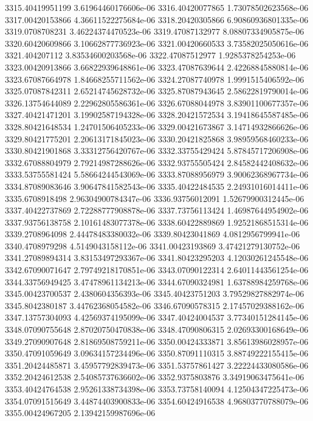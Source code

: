 {3315.40419951199 3.61964460176606e-06
3316.40420077865 1.73078502623568e-06
3317.00420153866 4.36611522275684e-06
3318.20420305866 6.90860936801335e-06
3319.0708708231 3.46224374470523e-06
3319.47087132977 8.08807334905875e-06
3320.60420609866 3.10662877736923e-06
3321.00420660533 3.73582025050616e-06
3321.404207112 3.83534600203568e-06
3322.47087512977 1.9285378254253e-06
3323.00420913866 3.66822939648861e-06
3323.47087639644 2.42268845880814e-06
3323.67087664978 1.84668255711562e-06
3324.27087740978 1.9991515406592e-06
3325.07087842311 2.65214745628732e-06
3325.87087943645 2.58622819790014e-06
3326.13754644089 2.22962805586361e-06
3326.67088044978 3.83901100677357e-06
3327.40421471201 3.19902587194328e-06
3328.20421572534 3.19418645587485e-06
3328.80421648534 1.24701506405233e-06
3329.00421673867 3.14714932866626e-06
3329.80421775201 2.20613171845023e-06
3330.20421825868 3.98959568460233e-06
3330.80421901868 3.33312756420767e-06
3332.33755429424 5.87845717206908e-06
3332.67088804979 2.79214987288626e-06
3332.93755505424 2.84582442408632e-06
3333.53755581424 5.58664244543069e-06
3333.87088956979 3.90062368967734e-06
3334.87089083646 3.90647841582543e-06
3335.40422484535 2.24931016014411e-06
3335.6708918498 2.96304900784347e-06
3336.93756012091 1.52679900312445e-06
3337.40422737869 2.72288777908878e-06
3337.73756113424 1.46987644954902e-06
3337.93756138758 2.10161483077378e-06
3338.60422889869 1.92521868515314e-06
3339.2708964098 2.44478483380032e-06
3339.80423041869 4.0812956799941e-06
3340.4708979298 4.5149043158112e-06
3341.00423193869 3.47421279130752e-06
3341.27089894314 3.83153497293367e-06
3341.80423295203 4.12030261245548e-06
3342.67090071647 2.79749218170851e-06
3343.07090122314 2.64011443561254e-06
3344.33756949425 3.47478961134213e-06
3344.67090324981 1.63788984259768e-06
3345.00423700537 2.4380604356393e-06
3345.40423751203 3.79529827882974e-06
3345.8042380187 3.44762368054582e-06
3346.67090578315 2.17457029388162e-06
3347.13757304093 4.42569374195099e-06
3347.40424004537 3.77340151284145e-06
3348.07090755648 2.87020750470838e-06
3348.47090806315 2.02693300168649e-06
3349.27090907648 2.81869508759211e-06
3350.00424333871 3.85613986028957e-06
3350.47091059649 3.09634157234496e-06
3350.87091110315 3.88749222155415e-06
3351.20424485871 3.45957792839473e-06
3351.53757861427 3.22224433080586e-06
3352.20424612538 2.54085737636602e-06
3352.9375803876 3.34919063475641e-06
3353.40424764538 2.95261338734398e-06
3353.73758140094 4.12504347225473e-06
3354.07091515649 3.44874403900833e-06
3354.60424916538 4.96803770788079e-06
3355.00424967205 2.13942159987696e-06
}
